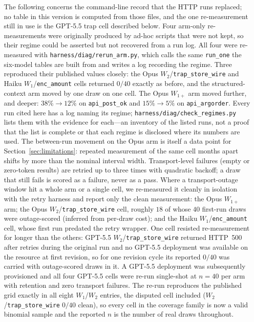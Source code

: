 \documentclass[11pt]{article}
\theoremstyle{plain}
\theoremstyle{definition}
\theoremstyle{remark}
\begin{document}
The following concerns the command-line record that the HTTP runs replaced; no table in this
version is computed from those files, and the one re-measurement still in use is the GPT-5.5 trap
cell described below. Four arm-only re-measurements were originally produced by ad-hoc scripts
that were not kept, so their regime could be asserted but not recovered from a run log. All four
were re-measured with \texttt{harness/diag/rerun\_arm.py}, which calls the same \texttt{run\_one}
the six-model tables are built from and writes a log recording the regime. Three reproduced their
published values closely: the Opus $W_2$/\texttt{trap\_store\_wire} and Haiku
$W_1$/\texttt{enc\_amount} cells returned $0/40$ exactly as before, and the structured-context arm
moved by one draw on one cell. The Opus $W_{1+}$ arm moved further, and deeper: $38\%\to12\%$ on
\texttt{api\_post\_ok} and $15\%\to5\%$ on \texttt{api\_argorder}. Every run cited here has a log
naming its regime;
\texttt{harness/diag/check\_regimes.py} lists them with the evidence for each---an inventory of
the listed runs, not a proof that the list is complete or that each regime is disclosed where its
numbers are used. The between-run
movement on the Opus arm is itself a data point for Section~\ref{sec:limitations}: repeated measurement
of the same cell months apart shifts by more than the nominal interval width. Transport-level failures (empty or zero-token results) are retried up to three
times with quadratic backoff; a draw that still fails is scored as a failure, never as a pass. Where a transport-outage window hit a whole arm or a single cell, we re-measured it cleanly in isolation with the retry harness and report only the clean measurement: the Opus $W_{1+}$ arm; the Opus $W_2$/\texttt{trap\_store\_wire} cell, roughly $18$ of whose $40$ first-run draws were outage-scored (inferred from per-draw cost); and the Haiku $W_1$/\texttt{enc\_amount} cell, whose first run predated the retry wrapper. One cell resisted re-measurement for longer than the others: GPT-5.5 $W_2$/\texttt{trap\_store\_wire} returned HTTP~500 after retries during the original run and no GPT-5.5 deployment was available on the resource at first revision, so for one revision cycle its reported $0/40$ was carried with outage-scored draws in it. A GPT-5.5 deployment was subsequently provisioned and all four GPT-5.5 cells were re-run single-shot at $n=40$ per arm with retention and zero transport failures. The re-run reproduces the published grid exactly in all eight $W_1$/$W_2$ entries, the disputed cell included ($W_2$/\texttt{trap\_store\_wire} $0/40$ clean), so every cell in the coverage family is now a valid binomial sample and the reported $n$ is the number of real draws throughout.
\end{document}
